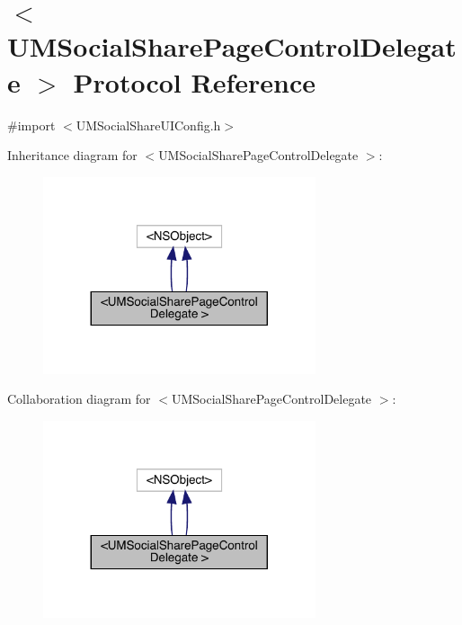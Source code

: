 \hypertarget{protocol_u_m_social_share_page_control_delegate_01-p}{}\section{$<$U\+M\+Social\+Share\+Page\+Control\+Delegate $>$ Protocol Reference}
\label{protocol_u_m_social_share_page_control_delegate_01-p}


{\ttfamily \#import $<$U\+M\+Social\+Share\+U\+I\+Config.\+h$>$}



Inheritance diagram for $<$U\+M\+Social\+Share\+Page\+Control\+Delegate $>$\+:\nopagebreak
\begin{figure}[H]
\begin{center}
\leavevmode
\includegraphics[width=227pt]{protocol_u_m_social_share_page_control_delegate_01-p__inherit__graph}
\end{center}
\end{figure}


Collaboration diagram for $<$U\+M\+Social\+Share\+Page\+Control\+Delegate $>$\+:\nopagebreak
\begin{figure}[H]
\begin{center}
\leavevmode
\includegraphics[width=227pt]{protocol_u_m_social_share_page_control_delegate_01-p__coll__graph}
\end{center}
\end{figure}
